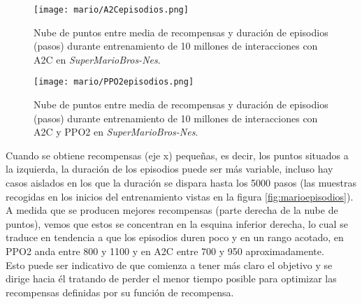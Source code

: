 \documentclass[11pt,fleqn]{book} %
\begin{document}
\begin{figure}[H]
	\centering\texttt{[image: mario/A2Cepisodios.png]}
	\caption{Nube de puntos entre media de recompensas y duración de episodios (pasos) durante entrenamiento de 10 millones de interacciones con A2C en \textit{SuperMarioBros-Nes}.}
	\label{fig:marioA2Cepisodios} %
\end{figure}

\begin{figure}[H]
	\centering\texttt{[image: mario/PPO2episodios.png]}
	\caption{Nube de puntos entre media de recompensas y duración de episodios (pasos) durante entrenamiento de 10 millones de interacciones con A2C y PPO2 en \textit{SuperMarioBros-Nes}.}
	\label{fig:marioPPO2episodios} %
\end{figure}

Cuando se obtiene recompensas (eje x) pequeñas, es decir, los puntos situados a la izquierda, la duración de los episodios puede ser más variable, incluso hay casos aislados en los que la duración se dispara hasta los 5000 pasos (las muestras recogidas en los inicios del entrenamiento vistas en la figura \ref{fig:marioepisodios}). \\

A medida que se producen mejores recompensas (parte derecha de la nube de puntos), vemos que estos se concentran en la esquina inferior derecha, lo cual se traduce en tendencia a que los episodios duren poco y en un rango acotado, en PPO2 anda entre 800 y 1100 y en A2C entre 700 y 950 aproximadamente. \\

Esto puede ser indicativo de que comienza a tener más claro el objetivo y se dirige hacia él tratando de perder el menor tiempo posible para optimizar las recompensas definidas por su función de recompensa. \\

\end{document}
